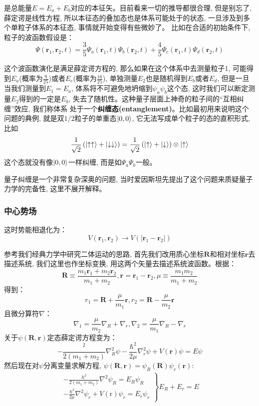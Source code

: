 是总能量$E=E_a+E_b$对应的本征矢。目前看来一切的推导都很合理, 但是别忘了, 薛定谔是线性方程, 所以本征态的叠加态也是体系可能处于的状态, 一旦涉及到多个单粒子体系的本征态, 事情就开始变得有些微妙了。
比如在合适的初始条件下, 粒子的波函数假设是：
\[\Psi\left(\mathbf{r}_{1}, \mathbf{r}_{2}, t\right)=\frac{3}{5} \Psi_{a}\left(\mathbf{r}_{1}, t\right) \Psi_{b}\left(\mathbf{r}_{2}, t\right)+\frac{4}{5} \Psi_{c}\left(\mathbf{r}_{1}, t\right) \Psi_{d}\left(\mathbf{r}_{2}, t\right)\]

这个波函数演化是满足薛定谔方程的, 那么如果在这个体系中去测量粒子1, 可能得到$E_a$(概率为$\frac{9}{25}$)或者$E_c$(概率为$\frac{16}{25}$), 单独测量$E_2$也是随机得到$E_b$或者$E_d$, 但是一旦
当我们测量到$E_1=E_a$, 体系将不可避免地坍缩到$\psi_a\psi_b$这个态, 这时我们可以断定测量$E_2$得到的一定是$E_b$, 失去了随机性。这种量子层面上神奇的粒子间的“互相纠缠”效应, 我们称体系
处于一个\textbf{纠缠态(entanglement)}。比如最初用来说明这个问题的典例, 就是双$1/2$粒子的单重态$\ket{0,0}$, 它无法写成单个粒子的态的直积形式, 比如
\[\frac{1}{\sqrt{2}}\left(\ket{\uparrow\uparrow}+\ket{\downarrow\downarrow}\right)=\frac{1}{\sqrt{2}}\left(\ket{\uparrow}+\ket{\downarrow}\right)\otimes\ket{\uparrow}\]
这个态就没有像$\ket{0,0}$一样纠缠, 而是如$\Psi_a\Psi_b$一般。

量子纠缠是一个非常复杂深奥的问题, 当时爱因斯坦先提出了这个问题来质疑量子力学的完备性, 这里不展开解释。

\subsubsection*{中心势场}
这时势能相退化为：
\[V(\mathbf{r}_1,\mathbf{r}_2)\rightarrow V(\left|\mathbf{r}_1-\mathbf{r}_2\right|)\]

参考我们经典力学中研究二体运动的思路, 首先我们改用质心坐标$\mathbf{R}$和相对坐标$\mathbf{r}$去描述系统, 我们这里也作坐标变换, 用这两个矢量去描述系统波函数。根据：
\[\mathbf{R}\equiv\frac{m_1\mathbf{r}_1+m_2\mathbf{r}_2}{m_1+m_2},\mathbf{r}=\mathbf{r}_1-\mathbf{r}_2,\mu\equiv\frac{m_1m_2}{m_1+m_2}\]
得到：
\[r_1=\mathbf{R}+\frac{\mu}{m_1}\mathbf{r},r_2=\mathbf{R}-\frac{\mu}{m_2}\mathbf{r}\]
且微分算符$\nabla$：
\[\nabla_1=\frac{\mu}{m_2}\nabla_R+\nabla_r,\nabla_2=\frac{\mu}{m_1}\nabla_R-\nabla_r\]
关于$\psi(\mathbf{R},\mathbf{r})$定态薛定谔方程变为：
\begin{equation}
    -\frac{^2}{2(m_1+m_2)}\nabla_R^2\psi-\frac{\hbar^2}{2\mu}\nabla_r^2\psi+V(\mathbf{r})\psi=E\psi
\end{equation}
然后现在对$\psi$分离变量求解方程, $\psi(\mathbf{R},\mathbf{r})=\psi_R(\mathbf{R})\psi_r(\mathbf{r})$:
\begin{align*}
    \left.\begin{array}{r}
        -\frac{\hbar^{2}}{2\left(m_{1}+m_{2}\right)} \nabla^{2} \psi_{R}=E_{R} \psi_{R} \\ 
       -\frac{\hbar^{2}}{2 \mu} \nabla^{2} \psi_{r}+V(\mathrm{r}) \psi_{r}=E_{r} \psi_{r}
      \end{array}\right\}E_R+E_r=E
\end{align*}

